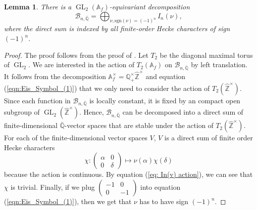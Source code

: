 \documentclass[11pt, a4paper]{amsart}
\theoremstyle{plain}
\newtheorem{lemma}[theorem]{Lemma}
\theoremstyle{definition}
\numberwithin{equation}{section}
\def\AAA{\mathbb{A}}
\def\QQ{\mathbb{Q}}
\def\ZZ{\mathbb{Z}}
\DeclareMathOperator{\GL}{\mathrm{GL}}
\begin{document}
\begin{lemma}
\label{Lemma: decomposition of source of Eisenstein symbol}
    There is a $\GL_2(\AAA_f)$-equivariant decomposition 
    \begin{equation*}
        \mathcal{B}_{n, \bar{\QQ}} = \bigoplus_{\nu, \mathrm{sgn}(\nu) = (-1)^{n}} I_n(\nu),
    \end{equation*}
    where the direct sum is indexed by all finite-order Hecke characters of sign $(-1)^{n}$. 
\end{lemma}

\begin{proof}
    The proof follows from the proof of \cite[Lemma 4.3]{LemmaII17}. Let $T_2$ be the diagonal maximal torus of $\GL_2$. We are interested in the action of $T_2(\AAA_f)$ on $\mathcal{B}_{n, \bar{\QQ}}$ by left translation. It follows from the decomposition $\AAA_f^{\times} = \QQ^{\times}_{+} \hat{\ZZ}^{\times}$ and equation (\ref{eqn:Eis_Symbol_(1)}) that we only need to consider the action of $T_2(\hat{\ZZ}^{\times})$. Since each function in $\mathcal{B}_{n, \bar{\QQ}}$ is locally constant, it is fixed by an compact open subgroup of $\GL_2(\hat{\ZZ}^{\times})$. Hence, $\mathcal{B}_{n, \bar{\QQ}}$ can be decomposed into a direct sum of finite-dimensional $\bar{\QQ}$-vector spaces that are stable under the action of $T_{2}(\hat{\ZZ}^{\times})$. For each of the finite-dimensional vector spaces $V$, $V$ is a direct sum of finite order Hecke characters
    \begin{equation*}
        \chi \colon \begin{pmatrix}
                \alpha & 0 \\
                0 & \delta  
              \end{pmatrix} \mapsto \nu(\alpha) \chi(\delta)
    \end{equation*}
    because the action is continuous.
    By equation (\ref{eq: In(v) action}), we can see that $\chi$ is trivial. Finally, if we plug $\begin{pmatrix}
                                                                                                -1 & 0 \\
                                                                                                0 & -1 
                                                                                           \end{pmatrix}$                                                      into  equation (\ref{eqn:Eis_Symbol_(1)}), then we get that $\nu$ has to have sign $(-1)^{n}$. 
\end{proof}
\end{document}
